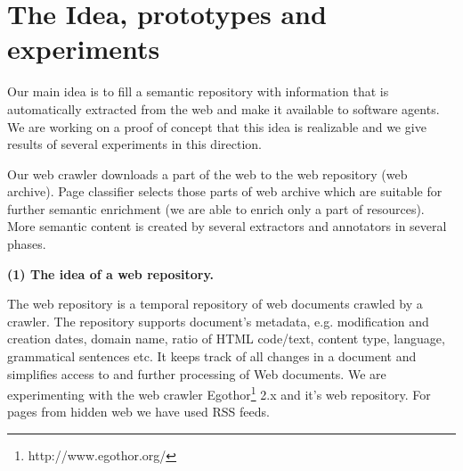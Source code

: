 \documentclass{www2009-submission}
\begin{document}
\section{The Idea, prototypes and experiments}

Our main idea is to fill a semantic repository with information that is automatically extracted from the web and make it available to software agents. We are working on a proof of concept that this idea is realizable and we give results of several experiments in this direction.

Our web crawler %
downloads a part of the web to the web repository (web archive). 
Page classifier selects those parts of web archive which are suitable for further semantic enrichment (we are able to enrich only a part of resources). More semantic content is created by several extractors and annotators in several phases. %



\textbf{(1) The idea of a web repository.}  



The web repository is a temporal repository of web documents crawled by a crawler. The repository supports document's metadata, e.g. modification and creation dates, domain name, ratio of HTML code/text, content type, language, grammatical sentences etc. It keeps track of all changes in a document and simplifies access to and further processing of Web documents. We are experimenting with the web crawler Egothor\footnote{http://www.egothor.org/} 2.x and it's web repository. %
For pages from hidden web we have used RSS feeds.
\end{document}
